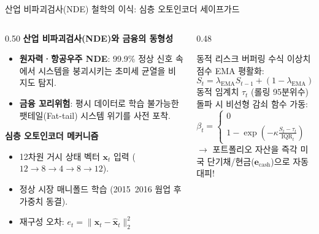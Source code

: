 \begin{frame}{산업 비파괴검사(NDE) 철학의 이식: 심층 오토인코더 세이프가드}
\begin{columns}[T]
  \begin{column}{0.50\textwidth}
    \textbf{산업 비파괴검사(NDE)와 금융의 동형성}
    \begin{itemize}
      \setlength{\itemsep}{4pt}
      \small
      \item \textbf{원자력·항공우주 NDE}: 99.9\% 정상 신호 속에서 시스템을 붕괴시키는 초미세 균열을 비지도 탐지.
      \item \textbf{금융 꼬리위험}: 평시 데이터로 학습 불가능한 팻테일(Fat-tail) 시스템 위기를 사전 포착.
    \end{itemize}
    
    \vspace{2mm}
    \textbf{심층 오토인코더 메커니즘}
    \begin{itemize}
      \setlength{\itemsep}{3pt}
      \small
      \item 12차원 거시 상태 벡터 $\mathbf{x}_t$ 입력 ($12 \rightarrow 8 \rightarrow 4 \rightarrow 8 \rightarrow 12$).
      \item 정상 시장 매니폴드 학습 (2015~2016 웜업 후 가중치 동결).
      \item 재구성 오차: $e_t = \|\mathbf{x}_t - \hat{\mathbf{x}}_t\|_2^2$
    \end{itemize}
  \end{column}
  
  \begin{column}{0.48\textwidth}
    \begin{block}{동적 리스크 버퍼링 수식}
      \small
      이상치 점수 EMA 평활화:
      \begin{equation*}
        S_t = \lambda_{\text{EMA}} S_{t-1} + (1-\lambda_{\text{EMA}}) e_t
      \end{equation*}
      동적 임계치 $\tau_t$ (롤링 95분위수) 돌파 시 비선형 감쇠 함수 가동:
      \begin{equation*}
        \beta_t = 
        \begin{cases}
          0 & (S_t \le \tau_t) \\
          1 - \exp\left(-\kappa \frac{S_t - \tau_t}{\text{IQR}_t}\right) & (S_t > \tau_t)
        \end{cases}
      \end{equation*}
      $\rightarrow$ 포트폴리오 자산을 즉각 미국 단기채/현금($\mathbf{e}_{\text{cash}}$)으로 자동 대피!
    \end{block}
  \end{column}
\end{columns}
\end{frame}

